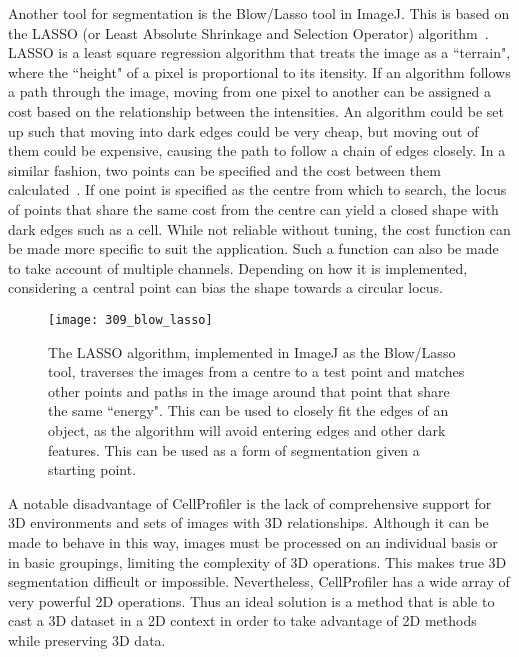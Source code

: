 Another tool for segmentation is the Blow/Lasso tool in ImageJ. This is based on the LASSO (or Least Absolute Shrinkage and Selection Operator) algorithm~\cite{}. LASSO is a least square regression algorithm that treats the image as a ``terrain", where the ``height" of a pixel is proportional to its itensity. If an algorithm follows a path through the image, moving from one pixel to another can be assigned a cost based on the relationship between the intensities. An algorithm could be set up such that moving into dark edges could be very cheap, but moving out of them could be expensive, causing the path to follow a chain of edges closely. In a similar fashion, two points can be specified and the cost between them calculated~\cite{}. If one point is specified as the centre from which to search, the locus of points that share the same cost from the centre can yield a closed shape with dark edges such as a cell. While not reliable without tuning, the cost function can be made more specific to suit the application. Such a function can also be made to take account of multiple channels. Depending on how it is implemented, considering a central point can bias the shape towards a circular locus.

\begin{figure}[h!]
 \centering
 \texttt{[image: 309\_blow\_lasso]}
 \caption[The LASSO tool]{
 	The LASSO algorithm, implemented in ImageJ as the Blow/Lasso tool, traverses the images from a centre to a test point and matches other points and paths in the image around that point that share the same ``energy". This can be used to closely fit the edges of an object, as the algorithm will avoid entering edges and other dark features. This can be used as a form of segmentation given a starting point.
 }
 \label{fig:blow}
\end{figure}

A notable disadvantage of CellProfiler is the lack of comprehensive support for 3D environments and sets of images with 3D relationships. Although it can be made to behave in this way, images must be processed on an individual basis or in basic groupings, limiting the complexity of 3D operations. This makes true 3D segmentation difficult or impossible. Nevertheless, CellProfiler has a wide array of very powerful 2D operations. Thus an ideal solution is a method that is able to cast a 3D dataset in a 2D context in order to take advantage of 2D methods while preserving 3D data.

